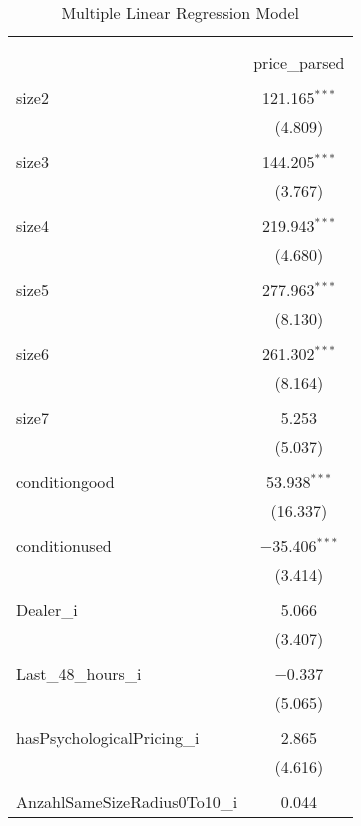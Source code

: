 
\begin{table}[H] \centering 
  \caption{Multiple Linear Regression Model} 
  \label{tab:mlr_model} 
\begin{tabular}{@{\extracolsep{5pt}}lc} 
\\[-1.8ex]\hline 
\hline \\[-1.8ex] 
\\[-1.8ex] & price\_parsed \\ 
\hline \\[-1.8ex] 
 size2 & 121.165$^{***}$ \\ 
  & (4.809) \\ 
  & \\ 
 size3 & 144.205$^{***}$ \\ 
  & (3.767) \\ 
  & \\ 
 size4 & 219.943$^{***}$ \\ 
  & (4.680) \\ 
  & \\ 
 size5 & 277.963$^{***}$ \\ 
  & (8.130) \\ 
  & \\ 
 size6 & 261.302$^{***}$ \\ 
  & (8.164) \\ 
  & \\ 
 size7 & 5.253 \\ 
  & (5.037) \\ 
  & \\ 
 conditiongood & 53.938$^{***}$ \\ 
  & (16.337) \\ 
  & \\ 
 conditionused & $-$35.406$^{***}$ \\ 
  & (3.414) \\ 
  & \\ 
 Dealer\_i & 5.066 \\ 
  & (3.407) \\ 
  & \\ 
 Last\_48\_hours\_i & $-$0.337 \\ 
  & (5.065) \\ 
  & \\ 
 hasPsychologicalPricing\_i & 2.865 \\ 
  & (4.616) \\ 
  & \\ 
 AnzahlSameSizeRadius0To10\_i & 0.044 \\ 

\end{tabular}
\end{table}
